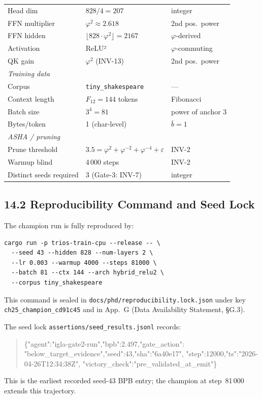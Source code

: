 \begin{table}[h]
{{{\begin{tabular}{lll}
Head dim & $828/4 = 207$ & integer\\
FFN multiplier & $\varphi^2 \approx 2.618$ & 2nd pos.\ power\\
FFN hidden & $\lfloor 828 \cdot \varphi^2 \rfloor = 2167$ & $\varphi$-derived\\
Activation & ReLU² & $\varphi$-commuting\\
QK gain & $\varphi^2$ (INV-13) & 2nd pos.\ power\\
\midrule
\multicolumn{3}{l}{\textit{Training data}}\\
Corpus & \texttt{tiny\_shakespeare} & —\\
Context length & $F_{12} = 144$ tokens & Fibonacci\\
Batch size & $3^4 = 81$ & power of anchor 3\\
Bytes/token & 1 (char-level) & $\bar{b}=1$\\
\midrule
\multicolumn{3}{l}{\textit{ASHA / pruning}}\\
Prune threshold & $3.5 = \varphi^2+\varphi^{-2}+\varphi^{-4}+\varepsilon$ & INV-2\\
Warmup blind & 4\,000 steps & INV-2\\
Distinct seeds required & 3 (Gate-3: INV-7) & integer\\
\bottomrule
\end{tabular}
}
}
}
\end{table}

\subsection{14.2 Reproducibility Command and Seed Lock}
\label{subsec:ch25-reproducibility}

The champion run is fully reproduced by:
\begin{verbatim}
cargo run -p trios-train-cpu --release -- \
  --seed 43 --hidden 828 --num-layers 2 \
  --lr 0.003 --warmup 4000 --steps 81000 \
  --batch 81 --ctx 144 --arch hybrid_relu2 \
  --corpus tiny_shakespeare
\end{verbatim}
This command is sealed in
\texttt{docs/phd/reproducibility.lock.json} under key
\texttt{ch25\_champion\_cd91c45} and in App.~G
(Data Availability Statement, §G.3).

The seed lock \texttt{assertions/seed\_results.jsonl} records:
\begin{quote}\footnotesize\ttfamily
\{"agent":"igla-gate2-run","bpb":2.497,"gate\_action":
"below\_target\_evidence","seed":43,"sha":"6a40e17",
"step":12000,"ts":"2026-04-26T12:34:38Z",
"victory\_check":"pre\_validated\_at\_emit"\}
\end{quote}
This is the earliest recorded seed-43 BPB entry; the champion
at step~81\,000 extends this trajectory.

